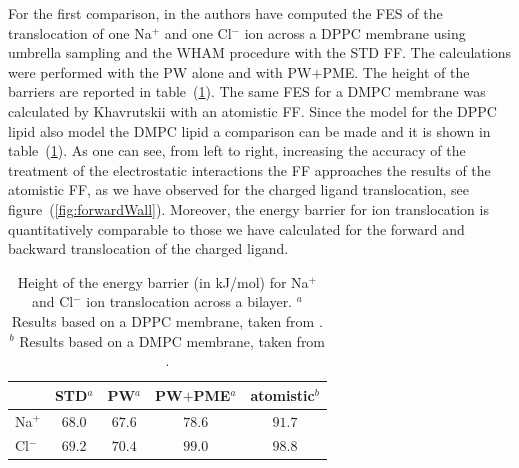 For the first comparison, in \cite{PW} the authors have computed the \ac{FES} of the translocation of one Na$^+$ and one Cl$^-$ ion across a \acs{DPPC} membrane using umbrella sampling and the \ac{WHAM} procedure with the \ac{STD} \martini \ac{FF}. The calculations were performed with the \ac{PW} alone and with \ac{PW}$+$\ac{PME}. The height of the barriers are reported in table~(\ref{tab:ionTranslocation}). The same \ac{FES} for a \acs{DMPC} membrane was calculated by Khavrutskii \etal \cite{atomisticTranslocation} with an atomistic \ac{FF}. Since the \martini model for the \acs{DPPC} lipid also model the \acs{DMPC} lipid a comparison can be made and it is shown in table~(\ref{tab:ionTranslocation}). As one can see, from left to right, increasing the accuracy of the treatment of the electrostatic interactions the \martini \ac{FF} approaches the results of the atomistic \ac{FF}, as we have observed for the charged ligand translocation, see figure~(\ref{fig:forwardWall}). Moreover, the energy barrier for ion translocation is quantitatively comparable to those we have calculated for the forward and backward translocation of the charged ligand.
\begin{table}[h!t]
	\centering
	\begin{tabular}{lcccc}
		\toprule	
		\,		& STD$^a$ 	& \acs{PW}$^a$ 	& \acs{PW}$+$\acs{PME}$^a$ 	& atomistic$^b$	\\ \toprule
		Na$^+$	& $68.0$& $67.6$	& $78.6$	& $91.7$ 	\\ \midrule
		Cl$^-$	& $69.2$& $70.4$	& $99.0$	& $98.8$	\\ \bottomrule
	\end{tabular}
	\caption{Height of the energy barrier (in kJ/mol) for Na$^+$ and Cl$^-$ ion translocation across a bilayer. $^a$ Results based on a \acs{DPPC} membrane, taken from \cite{PW}. $^b$ Results based on a \acs{DMPC} membrane, taken from \cite{atomisticTranslocation}.}%
	\label{tab:ionTranslocation}
\end{table}

